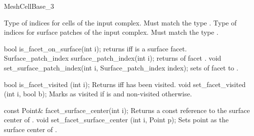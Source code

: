 \begin{ccRefConcept}{MeshCellBase_3}

{Type of indices for cells of the input complex. Must match the type .}
\ccGlue
{}
{Type of indices for surface patches of the input complex. Must match the type .}


\ccOperations



\ccMethod
{bool is_facet_on_surface(int i);}
{returns  iff  is a surface facet. }
\ccGlue
\ccMethod
{Surface_patch_index surface_patch_index(int i);}
{returns  of facet .}
\ccGlue
\ccMethod
{void set_surface_patch_index(int i, Surface_patch_index index);}
{sets  of facet  to .}

\ccMethod
{bool is_facet_visited (int i);}
{Returns  iff  has been visited.}
\ccGlue
\ccMethod
{void set_facet_visited (int i, bool b);} 
{Marks  as visited if  is 
 and non-visited otherwise.}

\ccMethod
{const Point& facet_surface_center(int i);}
{Returns a const reference to the surface center of .}
\ccGlue
\ccMethod
{void set_facet_surface_center (int i, Point p);} 
{Sets point  as the surface center of .}


\ccHasModels
{}


\ccSeeAlso

 \\
 \\

\end{ccRefConcept}

\ccRefPageEnd

